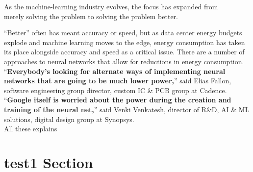 \documentclass[a4paper]{article}
\begin{document}
\vspace{1.3cm}
\Large
\noindent As the machine-learning industry evolves, the focus has expanded from\\merely solving
the problem to solving the problem better.

\noindent“Better” often has meant accuracy or speed, but as data center energy budgets explode and machine learning moves to the edge, energy consumption has taken its place alongside accuracy and speed as a critical issue. There are a number of approaches to neural networks that allow for reductions in energy consumption.\\

\noindent “{\bf Everybody’s looking for alternate ways of implementing neural networks that are going to be much lower power,}” said Elias Fallon, software engineering group director, custom IC \& PCB group at Cadence.\\

\noindent “{\bf Google itself is worried about the power during the creation and training of the neural net,}” said Venki Venkatesh, director of R\&D, AI \& ML solutions, digital design group at Synopsys.\\

\noindent All these explains  


\newpage
\section{test1 Section}
\newpage
\end{document}
